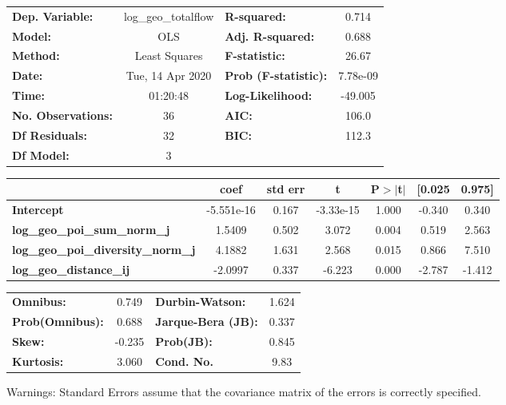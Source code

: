\begin{center}
\begin{tabular}{lclc}
\toprule
\textbf{Dep. Variable:}                    & log\_geo\_totalflow & \textbf{  R-squared:         } &     0.714   \\
\textbf{Model:}                            &         OLS         & \textbf{  Adj. R-squared:    } &     0.688   \\
\textbf{Method:}                           &    Least Squares    & \textbf{  F-statistic:       } &     26.67   \\
\textbf{Date:}                             &   Tue, 14 Apr 2020  & \textbf{  Prob (F-statistic):} &  7.78e-09   \\
\textbf{Time:}                             &       01:20:48      & \textbf{  Log-Likelihood:    } &   -49.005   \\
\textbf{No. Observations:}                 &            36       & \textbf{  AIC:               } &     106.0   \\
\textbf{Df Residuals:}                     &            32       & \textbf{  BIC:               } &     112.3   \\
\textbf{Df Model:}                         &             3       & \textbf{                     } &             \\
\bottomrule
\end{tabular}
\begin{tabular}{lcccccc}
                                           & \textbf{coef} & \textbf{std err} & \textbf{t} & \textbf{P$> |$t$|$} & \textbf{[0.025} & \textbf{0.975]}  \\
\midrule
\textbf{Intercept}                         &   -5.551e-16  &        0.167     & -3.33e-15  &         1.000        &       -0.340    &        0.340     \\
\textbf{log\_geo\_poi\_sum\_norm\_j}       &       1.5409  &        0.502     &     3.072  &         0.004        &        0.519    &        2.563     \\
\textbf{log\_geo\_poi\_diversity\_norm\_j} &       4.1882  &        1.631     &     2.568  &         0.015        &        0.866    &        7.510     \\
\textbf{log\_geo\_distance\_ij}            &      -2.0997  &        0.337     &    -6.223  &         0.000        &       -2.787    &       -1.412     \\
\bottomrule
\end{tabular}
\begin{tabular}{lclc}
\textbf{Omnibus:}       &  0.749 & \textbf{  Durbin-Watson:     } &    1.624  \\
\textbf{Prob(Omnibus):} &  0.688 & \textbf{  Jarque-Bera (JB):  } &    0.337  \\
\textbf{Skew:}          & -0.235 & \textbf{  Prob(JB):          } &    0.845  \\
\textbf{Kurtosis:}      &  3.060 & \textbf{  Cond. No.          } &     9.83  \\
\bottomrule
\end{tabular}
\end{center}

Warnings: \newline
 [1] Standard Errors assume that the covariance matrix of the errors is correctly specified.